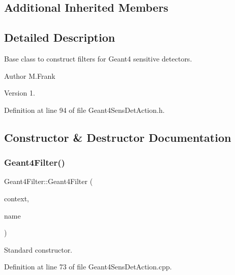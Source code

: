 \subsection*{Additional Inherited Members}


\subsection{Detailed Description}
Base class to construct filters for Geant4 sensitive detectors. 

\begin{DoxyAuthor}{Author}
M.\+Frank 
\end{DoxyAuthor}
\begin{DoxyVersion}{Version}
1. 
\end{DoxyVersion}


Definition at line 94 of file Geant4\+Sens\+Det\+Action.\+h.



\subsection{Constructor \& Destructor Documentation}
\hypertarget{class_d_d4hep_1_1_simulation_1_1_geant4_filter_a9473fedf4d296dd044a9310a9da57bb4}{}\label{class_d_d4hep_1_1_simulation_1_1_geant4_filter_a9473fedf4d296dd044a9310a9da57bb4} 
\subsubsection{\texorpdfstring{Geant4\+Filter()}{Geant4Filter()}}
{\footnotesize\ttfamily Geant4\+Filter\+::\+Geant4\+Filter (\begin{DoxyParamCaption}\item[{\hyperlink{class_d_d4hep_1_1_simulation_1_1_geant4_context}{Geant4\+Context} $\ast$}]{context,  }\item[{const std\+::string \&}]{name }\end{DoxyParamCaption})}



Standard constructor. 



Definition at line 73 of file Geant4\+Sens\+Det\+Action.\+cpp.



